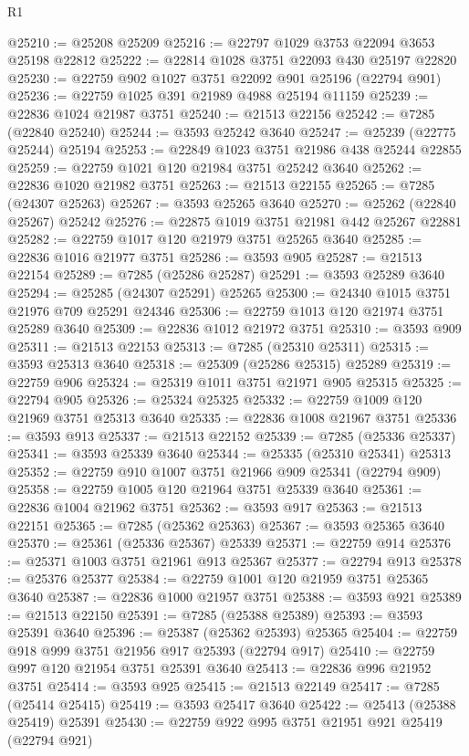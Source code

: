 \begin{lexlean}{R1}
\begin{coremodule}
@25210 := @25208 @25209
@25216 := @22797 @1029 @3753 @22094 @3653 @25198 @22812
@25222 := @22814 @1028 @3751 @22093 @430 @25197 @22820
@25230 := @22759 @902 @1027 @3751 @22092 @901 @25196 (@22794 @901)
@25236 := @22759 @1025 @391 @21989 @4988 @25194 @11159
@25239 := @22836 @1024 @21987 @3751
@25240 := @21513 @22156
@25242 := @7285 (@22840 @25240)
@25244 := @3593 @25242 @3640
@25247 := @25239 (@22775 @25244) @25194
@25253 := @22849 @1023 @3751 @21986 @438 @25244 @22855
@25259 := @22759 @1021 @120 @21984 @3751 @25242 @3640
@25262 := @22836 @1020 @21982 @3751
@25263 := @21513 @22155
@25265 := @7285 (@24307 @25263)
@25267 := @3593 @25265 @3640
@25270 := @25262 (@22840 @25267) @25242
@25276 := @22875 @1019 @3751 @21981 @442 @25267 @22881
@25282 := @22759 @1017 @120 @21979 @3751 @25265 @3640
@25285 := @22836 @1016 @21977 @3751
@25286 := @3593 @905
@25287 := @21513 @22154
@25289 := @7285 (@25286 @25287)
@25291 := @3593 @25289 @3640
@25294 := @25285 (@24307 @25291) @25265
@25300 := @24340 @1015 @3751 @21976 @709 @25291 @24346
@25306 := @22759 @1013 @120 @21974 @3751 @25289 @3640
@25309 := @22836 @1012 @21972 @3751
@25310 := @3593 @909
@25311 := @21513 @22153
@25313 := @7285 (@25310 @25311)
@25315 := @3593 @25313 @3640
@25318 := @25309 (@25286 @25315) @25289
@25319 := @22759 @906
@25324 := @25319 @1011 @3751 @21971 @905 @25315
@25325 := @22794 @905
@25326 := @25324 @25325
@25332 := @22759 @1009 @120 @21969 @3751 @25313 @3640
@25335 := @22836 @1008 @21967 @3751
@25336 := @3593 @913
@25337 := @21513 @22152
@25339 := @7285 (@25336 @25337)
@25341 := @3593 @25339 @3640
@25344 := @25335 (@25310 @25341) @25313
@25352 := @22759 @910 @1007 @3751 @21966 @909 @25341 (@22794 @909)
@25358 := @22759 @1005 @120 @21964 @3751 @25339 @3640
@25361 := @22836 @1004 @21962 @3751
@25362 := @3593 @917
@25363 := @21513 @22151
@25365 := @7285 (@25362 @25363)
@25367 := @3593 @25365 @3640
@25370 := @25361 (@25336 @25367) @25339
@25371 := @22759 @914
@25376 := @25371 @1003 @3751 @21961 @913 @25367
@25377 := @22794 @913
@25378 := @25376 @25377
@25384 := @22759 @1001 @120 @21959 @3751 @25365 @3640
@25387 := @22836 @1000 @21957 @3751
@25388 := @3593 @921
@25389 := @21513 @22150
@25391 := @7285 (@25388 @25389)
@25393 := @3593 @25391 @3640
@25396 := @25387 (@25362 @25393) @25365
@25404 := @22759 @918 @999 @3751 @21956 @917 @25393 (@22794 @917)
@25410 := @22759 @997 @120 @21954 @3751 @25391 @3640
@25413 := @22836 @996 @21952 @3751
@25414 := @3593 @925
@25415 := @21513 @22149
@25417 := @7285 (@25414 @25415)
@25419 := @3593 @25417 @3640
@25422 := @25413 (@25388 @25419) @25391
@25430 := @22759 @922 @995 @3751 @21951 @921 @25419 (@22794 @921)

\end{coremodule}
\end{lexlean}
